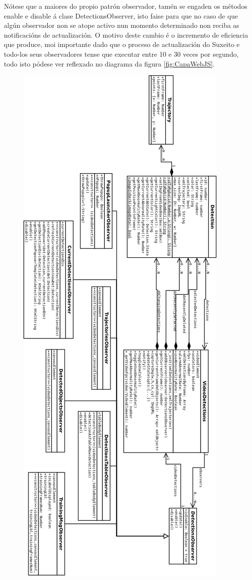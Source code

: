     Nótese que a maiores do propio patrón observador, tamén se engaden os métodos enable e disable á
    clase DetectionsObserver, isto faise para que no caso de que algún observador non se atope 
    activo nun momento determinado non reciba as notificacións de actualización. O motivo deste
    cambio é o incremento de eficiencia que produce, moi importante dado que o proceso de actualización
    do Suxeito e todo-los seus observadores tense que executar entre 10 e 30 veces por segundo, todo
    isto pódese ver reflexado no diagrama da figura \ref{fig:CapaWebJS}.
    
    \begin{figure}[htp]
    \begin{center}
        \includegraphics[scale=0.35]{figures/CapaWebJS.png}

\end{center}
\end{figure}
